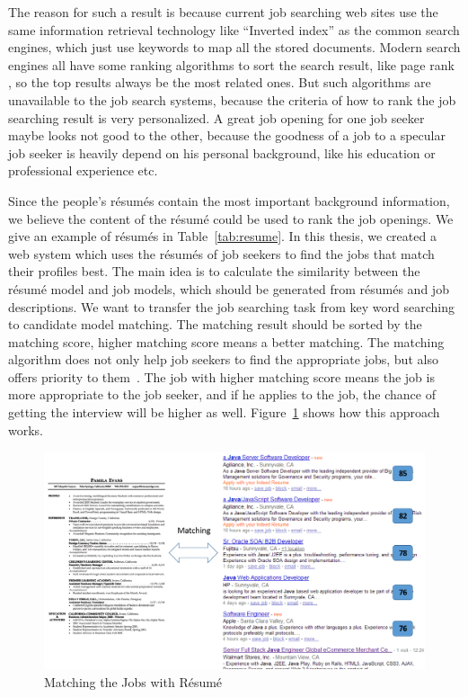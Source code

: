 The reason for such a result is because current job searching web sites use the same information retrieval technology like ``Inverted index'' \cite{zobel2006inverted} as the common search engines, which just use keywords to map all the stored documents. Modern search engines all have some ranking algorithms to sort the search result, like page rank \cite{page1999pagerank}, so the top results always be the most related ones. But such algorithms are unavailable to the job search systems, because the criteria  of how to rank the job searching result is very personalized. A great job opening for one job seeker maybe looks not good to the other, because the goodness of a job to a specular job seeker is heavily depend on his personal background, like his education or professional experience etc.

Since the people's r\'esum\'es contain the most important background information, we believe the content of the r\'esum\'e could be used to rank the job openings. We give an example of r\'esum\'es in Table~\ref{tab:resume}. In this thesis, we created a web system which uses the r\'esum\'es of job seekers to find the jobs that match their profiles best. The main idea is to calculate the similarity between the r\'esum\'e model and job models, which should be generated from r\'esum\'es and job descriptions. We want to transfer the job searching task from key word searching to candidate model matching. The matching result should be sorted by the matching score, higher matching score means a better matching. The matching algorithm does not only help job seekers to find the appropriate jobs, but also offers priority to them~\cite{gueutal2006brave}.  The job with higher matching score means the job is more appropriate to the job seeker, and if he applies to the job, the chance of getting the interview will be higher as well. Figure~\ref{fig:Matching} shows how this approach works.


\begin{figure}[htbp]
  \centering
  \includegraphics[scale=0.45]{images/matching.png}
  \caption{Matching the Jobs with R\'esum\'e}
  \label{fig:Matching}
\end{figure}


